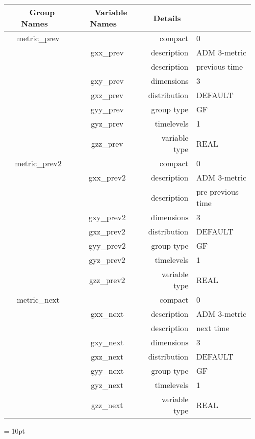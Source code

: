 \begin{tabular*}{150mm}{|c|c@{\extracolsep{\fill}}|rl|} \hline 
~ {\bf Group Names} ~ & ~ {\bf Variable Names} ~  &{\bf Details} ~ & ~\\ 
\hline 
metric\_prev &  & compact & 0 \\ 
 & gxx\_prev & description & ADM 3-metric \\ 
& ~ & description &  previous time \\ 
 & gxy\_prev & dimensions & 3 \\ 
 & gxz\_prev & distribution & DEFAULT \\ 
 & gyy\_prev & group type & GF \\ 
 & gyz\_prev & timelevels & 1 \\ 
 & gzz\_prev & variable type & REAL \\ 
\hline 
metric\_prev2 &  & compact & 0 \\ 
 & gxx\_prev2 & description & ADM 3-metric \\ 
& ~ & description &  pre-previous time \\ 
 & gxy\_prev2 & dimensions & 3 \\ 
 & gxz\_prev2 & distribution & DEFAULT \\ 
 & gyy\_prev2 & group type & GF \\ 
 & gyz\_prev2 & timelevels & 1 \\ 
 & gzz\_prev2 & variable type & REAL \\ 
\hline 
metric\_next &  & compact & 0 \\ 
 & gxx\_next & description & ADM 3-metric \\ 
& ~ & description &  next time \\ 
 & gxy\_next & dimensions & 3 \\ 
 & gxz\_next & distribution & DEFAULT \\ 
 & gyy\_next & group type & GF \\ 
 & gyz\_next & timelevels & 1 \\ 
 & gzz\_next & variable type & REAL \\ 
\hline 
\end{tabular*} 



\vspace{5mm}\parskip = 10pt 
